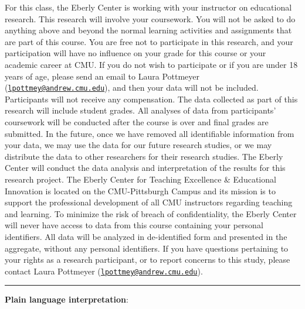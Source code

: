 \documentclass[]{tufte-handout}
\begin{document}
For this class, the Eberly Center is working with your instructor on
educational research. This research will involve your coursework. You
will not be asked to do anything above and beyond the normal learning
activities and assignments that are part of this course. You are free
not to participate in this research, and your participation will have no
influence on your grade for this course or your academic career at CMU.
If you do not wish to participate or if you are under 18 years of age,
please send an email to Laura Pottmeyer
(\href{mailto:lpottmey@andrew.cmu.edu}{\nolinkurl{lpottmey@andrew.cmu.edu}}),
and then your data will not be included. Participants will not receive
any compensation. The data collected as part of this research will
include student grades. All analyses of data from participants'
coursework will be conducted after the course is over and final grades
are submitted. In the future, once we have removed all identifiable
information from your data, we may use the data for our future research
studies, or we may distribute the data to other researchers for their
research studies. The Eberly Center will conduct the data analysis and
interpretation of the results for this research project. The Eberly
Center for Teaching Excellence \& Educational Innovation is located on
the CMU-Pittsburgh Campus and its mission is to support the professional
development of all CMU instructors regarding teaching and learning. To
minimize the risk of breach of confidentiality, the Eberly Center will
never have access to data from this course containing your personal
identifiers. All data will be analyzed in de-identified form and
presented in the aggregate, without any personal identifiers. If you
have questions pertaining to your rights as a research participant, or
to report concerns to this study, please contact Laura Pottmeyer
(\href{mailto:lpottmey@andrew.cmu.edu}{\nolinkurl{lpottmey@andrew.cmu.edu}}).

\begin{center}\rule{0.5\linewidth}{0.5pt}\end{center}

\textbf{Plain language interpretation}:
\end{document}
